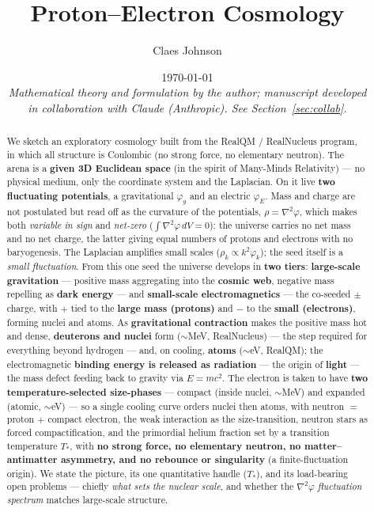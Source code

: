 \documentclass[11pt]{article}
\title{\textbf{Proton--Electron Cosmology}}
\author[1]{Claes Johnson}
\affil[1]{KTH Royal Institute of Technology, Stockholm, Sweden \\ \texttt{claesjohnson@gmail.com}}
\date{\today \\[0.4em]
\small\textit{Mathematical theory and formulation by the author; manuscript developed} \\
\small\textit{in collaboration with Claude (Anthropic). See Section~\ref{sec:collab}.}}
\newcommand{\grad}{\nabla}
\begin{document}
\maketitle

\begin{abstract}
We sketch an exploratory cosmology built from the RealQM / RealNucleus program, in which all
structure is Coulombic (no strong force, no elementary neutron). The arena is a \textbf{given 3D
Euclidean space} (in the spirit of Many-Minds Relativity) --- no physical medium, only the coordinate
system and the Laplacian. On it live \textbf{two fluctuating potentials}, a gravitational $\varphi_g$ and
an electric $\varphi_E$. Mass and charge are not postulated but read
off as the curvature of the potentials, $\rho=\grad^2\varphi$, which makes both \emph{variable in
sign} and \emph{net-zero} ($\int\grad^2\varphi\,dV=0$): the universe carries no net mass and no net
charge, the latter giving equal numbers of protons and electrons with no baryogenesis. The Laplacian
amplifies small scales ($\rho_k\propto k^2\varphi_k$); the seed itself is a \emph{small fluctuation}.
From this one seed the universe develops in \textbf{two tiers}: \textbf{large-scale gravitation} ---
positive mass aggregating into the \textbf{cosmic web}, negative mass repelling as \textbf{dark energy}
--- and \textbf{small-scale electromagnetics} --- the co-seeded $\pm$charge, with $+$ tied to the
\textbf{large mass (protons)} and $-$ to the \textbf{small (electrons)}, forming nuclei and atoms. As
\textbf{gravitational contraction} makes the positive mass hot and dense, \textbf{deuterons and nuclei}
form (${\sim}$MeV, RealNucleus) --- the step required for everything beyond hydrogen --- and, on cooling,
\textbf{atoms} (${\sim}$eV, RealQM); the electromagnetic \textbf{binding energy is released as radiation}
--- the origin of \textbf{light} --- the mass defect feeding back to gravity via $E=mc^2$. The
electron is taken to have \textbf{two temperature-selected size-phases} --- compact (inside nuclei,
${\sim}$MeV) and expanded (atomic, ${\sim}$eV) --- so a single cooling curve orders nuclei then atoms, with
neutron $=$ proton $+$ compact electron, the weak interaction as the size-transition, neutron stars
as forced compactification, and the primordial helium fraction set by a transition temperature
$T_\ast$, with \textbf{no strong force, no elementary neutron, no matter--antimatter asymmetry, and no
rebounce or singularity} (a finite-fluctuation origin). We state the picture, its one quantitative handle
($T_\ast$), and its load-bearing open problems --- chiefly \emph{what sets the nuclear scale}, and whether
the $\grad^2\varphi$ \emph{fluctuation spectrum} matches large-scale structure.


\end{abstract}
\end{document}
